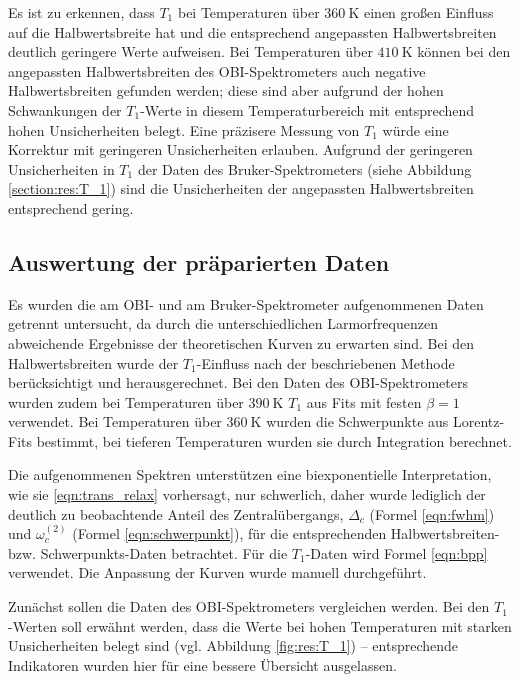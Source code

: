 Es ist zu erkennen, dass $T_1$ bei Temperaturen über $\SI{360}{\kelvin}$ einen großen Einfluss auf die Halbwertsbreite hat und die entsprechend angepassten Halbwertsbreiten deutlich geringere Werte aufweisen. Bei Temperaturen über $\SI{410}{\kelvin}$ können bei den angepassten Halbwertsbreiten des OBI-Spektrometers auch negative Halbwertsbreiten gefunden werden; diese sind aber aufgrund der hohen Schwankungen der $T_1$-Werte in diesem Temperaturbereich mit entsprechend hohen Unsicherheiten belegt. Eine präzisere Messung von $T_1$ würde eine Korrektur mit geringeren Unsicherheiten erlauben. Aufgrund der geringeren Unsicherheiten in $T_1$ der Daten des Bruker-Spektrometers (siehe Abbildung \ref{section:res:T_1}) sind die Unsicherheiten der angepassten Halbwertsbreiten entsprechend gering.


\subsection{Auswertung der präparierten Daten} \label{sub:res:auswertung}

Es wurden die am OBI- und am Bruker-Spektrometer aufgenommenen Daten getrennt untersucht, da durch die unterschiedlichen Larmorfrequenzen abweichende Ergebnisse der theoretischen Kurven zu erwarten sind. Bei den Halbwertsbreiten wurde der $T_1$-Einfluss nach der beschriebenen Methode berücksichtigt und herausgerechnet. Bei den Daten des OBI-Spektrometers wurden zudem bei Temperaturen über $\SI{390}{\kelvin}$ $T_1$ aus Fits mit festen $\beta = 1$ verwendet. Bei Temperaturen über $\SI{360}{\kelvin}$ wurden die Schwerpunkte aus Lorentz-Fits bestimmt, bei tieferen Temperaturen wurden sie durch Integration berechnet.

Die aufgenommenen Spektren unterstützen eine biexponentielle Interpretation, wie sie \eqref{eqn:trans_relax} vorhersagt, nur schwerlich, daher wurde lediglich der deutlich zu beobachtende Anteil des Zentralübergangs, $\Delta_c$ (Formel \eqref{eqn:fwhm}) und $\omega_c^{(2)}$ (Formel \eqref{eqn:schwerpunkt}), für die entsprechenden Halbwertsbreiten- bzw. Schwer\-punkts-Da\-ten betrachtet. Für die $T_1$-Daten wird Formel \eqref{eqn:bpp} verwendet. Die Anpassung der Kurven wurde manuell durchgeführt.



Zunächst sollen die Daten des OBI-Spektrometers vergleichen werden. Bei den $T_1$-Werten soll erwähnt werden, dass die Werte bei hohen Temperaturen mit starken Unsicherheiten belegt sind (vgl. Abbildung \ref{fig:res:T_1}) -- entsprechende Indikatoren wurden hier für eine bessere Übersicht ausgelassen.

